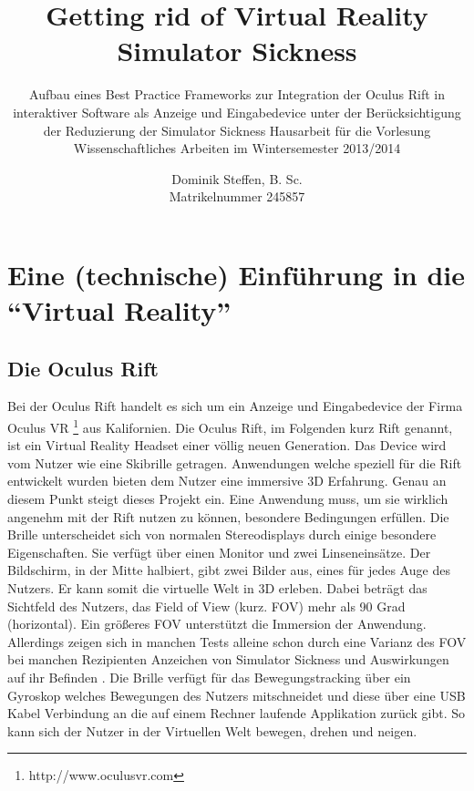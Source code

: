 \documentclass[pagesize, paper=a4, fontsize=12pt,titlepage=true, headings=small, headnosepline, abstractoff, liststotoc, nochapterprefix, plainheadsepline, twoside]{scrreprt}
\author{
Dominik Steffen, B. Sc.
\\
Matrikelnummer 245857
}
\title{Getting rid of Virtual Reality Simulator Sickness}
\subtitle{Aufbau eines Best Practice Frameworks zur Integration der Oculus Rift in interaktiver Software als Anzeige und Eingabedevice unter der Berücksichtigung der Reduzierung der Simulator Sickness
\newline
\newline
Hausarbeit für die Vorlesung Wissenschaftliches Arbeiten im Wintersemester 2013/2014
}
\begin{document}
\maketitle
%


\begingroup
	\tableofcontents
	\thispagestyle{empty}
\endgroup


\renewcommand*{\chapterpagestyle}{plain}
\pagestyle{plain}
\setcounter{page}{0}

\chapter{Eine (technische) Einführung in die "`Virtual Reality"'}

\section{Die Oculus Rift}
Bei der Oculus Rift handelt es sich um ein Anzeige und Eingabedevice der Firma Oculus VR \footnote{http://www.oculusvr.com} aus Kalifornien. Die Oculus Rift, im Folgenden kurz Rift genannt, ist ein Virtual Reality Headset einer völlig neuen Generation. Das Device wird vom Nutzer wie eine Skibrille getragen. Anwendungen welche speziell für die Rift entwickelt wurden bieten dem Nutzer eine immersive 3D Erfahrung. Genau an diesem Punkt steigt dieses Projekt ein. Eine Anwendung muss, um sie wirklich angenehm mit der Rift nutzen zu können, besondere Bedingungen erfüllen. Die Brille unterscheidet sich von normalen Stereodisplays durch einige besondere Eigenschaften. Sie verfügt über einen Monitor und zwei Linseneinsätze. Der Bildschirm, in der Mitte halbiert, gibt zwei Bilder aus, eines für jedes Auge des Nutzers. Er kann somit die virtuelle Welt in 3D erleben. Dabei beträgt das Sichtfeld des Nutzers, das Field of View (kurz. FOV) mehr als 90 Grad (horizontal). Ein größeres FOV unterstützt die Immersion der Anwendung. Allerdings zeigen sich in manchen Tests alleine schon durch eine Varianz des FOV bei manchen Rezipienten Anzeichen von Simulator Sickness und Auswirkungen auf ihr Befinden \cite{SeayKrumHodgesRibarsky2001}. Die Brille verfügt für das Bewegungstracking über ein Gyroskop welches Bewegungen des Nutzers mitschneidet und diese über eine USB Kabel Verbindung an die auf einem Rechner laufende Applikation zurück gibt. So kann sich der Nutzer in der Virtuellen Welt bewegen, drehen und neigen.
\end{document}
